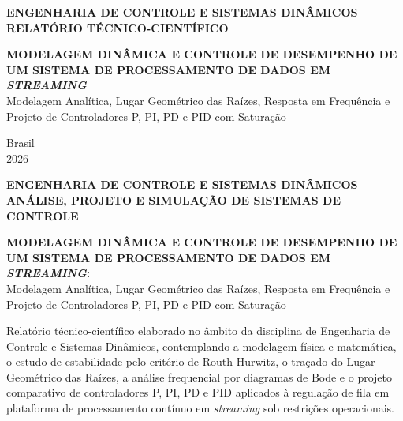 \begin{titlepage}
\thispagestyle{empty}
\begin{center}
    \singlespacing
    \textbf{ENGENHARIA DE CONTROLE E SISTEMAS DINÂMICOS}\\
    \textbf{RELATÓRIO TÉCNICO-CIENTÍFICO}

    \vfill

    {\bfseries\large MODELAGEM DINÂMICA E CONTROLE DE DESEMPENHO DE UM SISTEMA DE PROCESSAMENTO DE DADOS EM \textit{STREAMING}}\\[0.5cm]
    {Modelagem Analítica, Lugar Geométrico das Raízes, Resposta em Frequência e Projeto de Controladores P, PI, PD e PID com Saturação}

    \vfill

    Brasil\\
    2026
\end{center}
\end{titlepage}

\pagestyle{empty}

\thispagestyle{empty}
\begin{center}
    \singlespacing
    \textbf{ENGENHARIA DE CONTROLE E SISTEMAS DINÂMICOS}\\
    \textbf{ANÁLISE, PROJETO E SIMULAÇÃO DE SISTEMAS DE CONTROLE}

    \vspace{4.0cm}

    {\bfseries\large MODELAGEM DINÂMICA E CONTROLE DE DESEMPENHO DE UM SISTEMA DE PROCESSAMENTO DE DADOS EM \textit{STREAMING}:}\\[0.25cm]
    {Modelagem Analítica, Lugar Geométrico das Raízes, Resposta em Frequência e Projeto de Controladores P, PI, PD e PID com Saturação}
\end{center}

\vspace{2.5cm}

\noindent\hspace{0.42\textwidth}\parbox{0.58\textwidth}{%
    \singlespacing\small
    Relatório técnico-científico elaborado no âmbito da disciplina de Engenharia de Controle e Sistemas Dinâmicos, contemplando a modelagem física e matemática, o estudo de estabilidade pelo critério de Routh-Hurwitz, o traçado do Lugar Geométrico das Raízes, a análise frequencial por diagramas de Bode e o projeto comparativo de controladores P, PI, PD e PID aplicados à regulação de fila em plataforma de processamento contínuo em \textit{streaming} sob restrições operacionais.%
}

